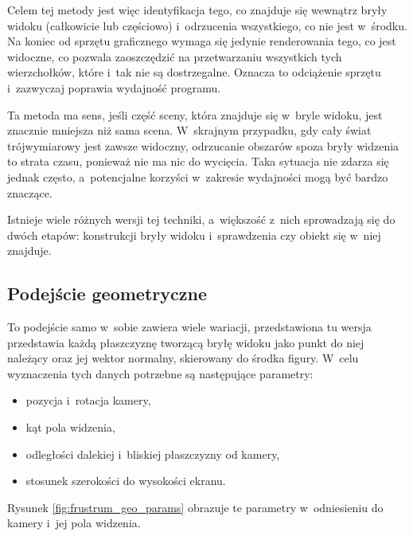 \documentclass[a4paper,twoside,12pt]{book}
\begin{document}
Celem tej metody jest więc identyfikacja tego, co znajduje się wewnątrz bryły widoku (całkowicie lub częściowo) i~odrzucenia wszystkiego, co nie jest w~środku. Na koniec od sprzętu graficznego wymaga się jedynie renderowania tego, co jest widoczne, co pozwala zaoszczędzić na przetwarzaniu wszystkich tych wierzchołków, które i~tak nie są dostrzegalne. Oznacza to odciążenie sprzętu i~zazwyczaj poprawia wydajność programu.

Ta metoda ma sens, jeśli część sceny, która znajduje się w~bryle widoku, jest znacznie mniejsza niż sama scena. W~skrajnym przypadku, gdy cały świat trójwymiarowy jest zawsze widoczny, odrzucanie obszarów spoza bryły widzenia to strata czasu, ponieważ nie ma nic do wycięcia. Taka sytuacja nie zdarza się jednak często, a~potencjalne korzyści w~zakresie wydajności mogą być bardzo znaczące.

Istnieje wiele różnych wersji tej techniki, a~większość z~nich sprowadzają się do dwóch etapów: konstrukcji bryły widoku i~sprawdzenia czy obiekt się w~niej znajduje.

\subsection{Podejście geometryczne}
To podejście samo w~sobie zawiera wiele wariacji, przedstawiona tu wersja przedstawia każdą płaszczyznę tworzącą bryłę widoku jako punkt do niej należący oraz jej wektor normalny, skierowany do środka figury. W~celu wyznaczenia tych danych potrzebne są następujące parametry:
\begin{itemize}
    \item pozycja i~rotacja kamery,
    \item kąt pola widzenia,
    \item odległości dalekiej i~bliskiej płaszczyzny od kamery,
    \item stosunek szerokości do wysokości ekranu.
\end{itemize}
Rysunek \ref{fig:frustrum_geo_params} obrazuje te parametry w~odniesieniu do kamery i~jej pola widzenia.
\end{document}
